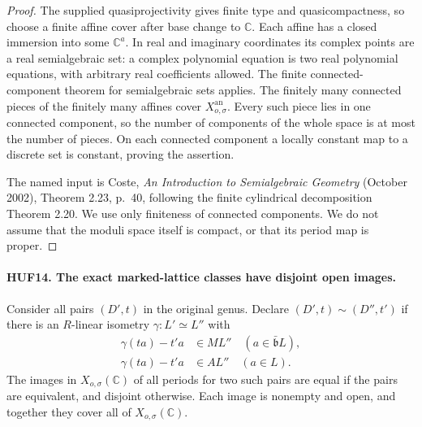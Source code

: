 \documentclass[11pt,a4paper]{article}
\numberwithin{equation}{section}
\theoremstyle{remark}\newtheorem{remark}[theorem]{Remark}
\begin{document}
\begin{proof}
The supplied quasiprojectivity gives finite type and
quasicompactness, so choose a finite affine cover after
base change to \(\mathbb C\).  Each affine has a closed
immersion into some \(\mathbb C^a\).  In real and
imaginary coordinates its complex points are a real
semialgebraic set: a complex polynomial equation is
two real polynomial equations, with arbitrary real
coefficients allowed.  The finite connected-component
theorem for semialgebraic sets applies.
The finitely many connected pieces of the finitely
many affines cover \(X_{o,\sigma}^{\mathrm{an}}\).
Every such piece lies in one connected component,
so the number of components of the whole space is
at most the number of pieces.  On each connected
component a locally constant map to a discrete set
is constant, proving the assertion.

The named input is Coste, \emph{An Introduction to
Semialgebraic Geometry} (October 2002), Theorem 2.23,
p.\ 40, following the finite cylindrical decomposition
Theorem 2.20.  We use only finiteness of connected
components.  We do not assume that the moduli space
itself is compact, or that its period map is proper.
\end{proof}

\paragraph{HUF14. The exact marked-lattice classes have disjoint open images.}
\label{claim:HUF14}
Consider all pairs \((D',t)\) in the original genus.
Declare \((D',t)\sim(D'',t')\) if there is an
\(R\)-linear isometry \(\gamma:L'\simeq L''\) with
\[
 \begin{split}
 \gamma(ta)-t'a&\in ML''\quad(a\in\bar{\mathfrak b}L),\\
 \gamma(ta)-t'a&\in AL''\quad(a\in L).
 \end{split}                                                     \tag{HUF.10}
\]
The images in \(X_{o,\sigma}(\mathbb C)\) of all periods
for two such pairs are equal if the pairs are equivalent,
and disjoint otherwise.  Each image is nonempty and open,
and together they cover all of \(X_{o,\sigma}(\mathbb C)\).
\end{document}
